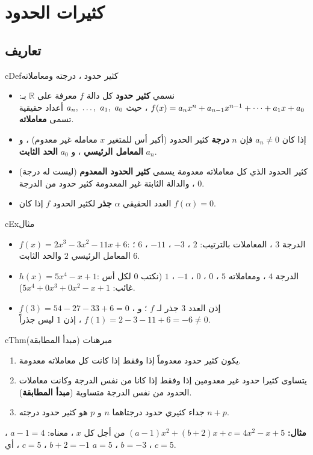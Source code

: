 \documentclass[12pt,a4paper]{article}
\newenvironment{BOX}[2]{\begin{otherlanguage}{english}\begin{arbox}{#1}{#2}}{\end{arbox}\end{otherlanguage}}
\newenvironment{tarif}[1][تعريف]{\begin{BOX}{cDef}{#1}}{\end{BOX}}
\newenvironment{khassia}[1][خاصية]{\begin{BOX}{cThm}{#1}}{\end{BOX}}
\newenvironment{mithal}[1][مثال]{\begin{BOX}{cEx}{#1}}{\end{BOX}}
\renewcommand{\ldots}{\mathinner{\ldotp\ldotp\ldotp}}
\renewcommand{\cdots}{\mathinner{\cdotp\cdotp\cdotp}}
\newcommand{\R}{\mathbb{R}}
\begin{document}
\section{كثيرات الحدود}
\subsection{تعاريف}
\begin{tarif}[كثير حدود ، درجته ومعاملاته]
\begin{itemize}
\item نسمي \textbf{كثير حدود} كل دالة $f$ معرفة على $\R$ بـ: $f(x)=a_nx^n+a_{n-1}x^{n-1}+\cdots+a_1x+a_0$ ، حيث $a_n,\ \ldots,\ a_1,\ a_0$ أعداد حقيقية تسمى \textbf{معاملاته}.
\item إذا كان $a_n\neq0$ فإن $n$ \textbf{درجة} كثير الحدود (أكبر أس للمتغير $x$ معامله غير معدوم) ، و $a_n$ \textbf{المعامل الرئيسي} ، و $a_0$ \textbf{الحد الثابت}.
\item كثير الحدود الذي كل معاملاته معدومة يسمى \textbf{كثير الحدود المعدوم} (ليست له درجة) ، والدالة الثابتة غير المعدومة كثير حدود من الدرجة $0$.
\item العدد الحقيقي $\alpha$ \textbf{جذر} لكثير الحدود $f$ إذا كان $f(\alpha)=0$.
\end{itemize}
\end{tarif}
\begin{mithal}
\begin{itemize}
\item $f(x)=2x^3-3x^2-11x+6$: الدرجة $3$ ، المعاملات بالترتيب: $2$ ، $-3$ ، $-11$ ، $6$ ؛ المعامل الرئيسي $2$ والحد الثابت $6$.
\item $h(x)=5x^4-x+1$: الدرجة $4$ ، ومعاملاته $5$ ، $0$ ، $0$ ، $-1$ ، $1$ (نكتب $0$ لكل أس غائب: $5x^4+0x^3+0x^2-x+1$).
\item $f(3)=54-27-33+6=0$ ، إذن العدد $3$ جذر لـ $f$ ؛ و $f(1)=2-3-11+6=-6\neq0$ ، إذن $1$ ليس جذراً.
\end{itemize}
\end{mithal}
\begin{khassia}[مبرهنات (مبدأ المطابقة)]
\begin{enumerate}
\item يكون كثير حدود معدوماً إذا وفقط إذا كانت كل معاملاته معدومة.
\item يتساوى كثيرا حدود غير معدومين إذا وفقط إذا كانا من نفس الدرجة وكانت معاملات الحدود من نفس الدرجة متساوية (\textbf{مبدأ المطابقة}).
\item جداء كثيري حدود درجتاهما $n$ و $p$ هو كثير حدود درجته $n+p$.
\end{enumerate}
\textbf{مثال:} $(a-1)x^2+(b+2)x+c=4x^2-x+5$ من أجل كل $x$ ، معناه: $a-1=4$ ، $b+2=-1$ ، $c=5$ ، أي $a=5$ ، $b=-3$ ، $c=5$.
\end{khassia}
\end{document}
